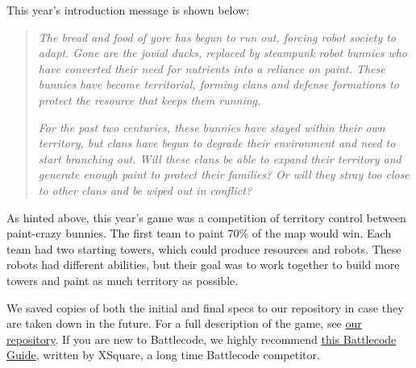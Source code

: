 This year's introduction message is shown below:

\begin{quote}
  \textit{The bread and food of yore has begun to run out, forcing robot society to adapt. Gone are the jovial ducks, replaced by steampunk robot bunnies who have converted their need for nutrients into a reliance on paint. These bunnies have become territorial, forming clans and defense formations to protect the resource that keeps them running.}
  
  \medskip
  
  \textit{For the past two centuries, these bunnies have stayed within their own territory, but clans have begun to degrade their environment and need to start branching out. Will these clans be able to expand their territory and generate enough paint to protect their families? Or will they stray too close to other clans and be wiped out in conflict?}
\end{quote}

As hinted above, this year's game was a competition of territory control between paint-crazy bunnies. The first team to paint 70\% of the map would win. Each team had two starting towers, which could produce resources and robots. These robots had different abilities, but their goal was to work together to build more towers and paint as much territory as possible.

\medskip

We saved copies of both the initial and final specs to our repository in case they are taken down in the future. For a full description of the game, see \href{https://github.com/justinottesen/battlecode25}{our repository}. If you are new to Battlecode, we highly recommend \href{https://battlecode.org/assets/files/battlecode-guide-xsquare.pdf}{this Battlecode Guide}, written by XSquare, a long time Battlecode competitor.